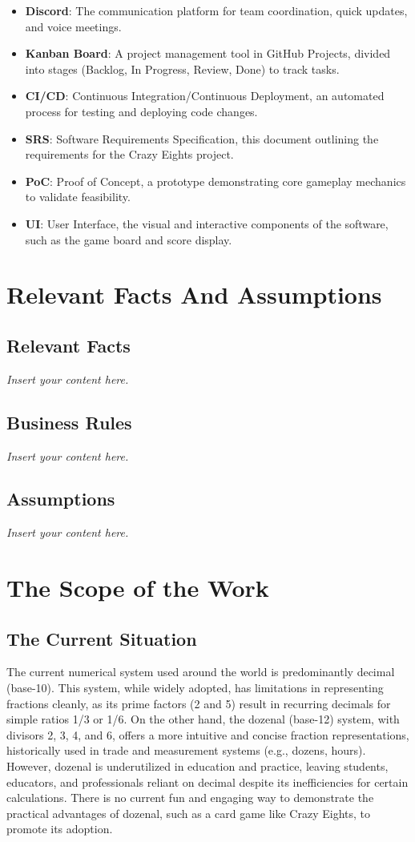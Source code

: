 \documentclass[12pt]{article}
\newcommand{\lips}{\textit{Insert your content here.}}
\begin{document}
\begin{itemize}
    \item \textbf{Discord}: The communication platform for team coordination, quick updates, and voice meetings.
    \item \textbf{Kanban Board}: A project management tool in GitHub Projects, divided into stages (Backlog, In Progress, Review, Done) to track tasks.
    \item \textbf{CI/CD}: Continuous Integration/Continuous Deployment, an automated process for testing and deploying code changes.
    \item \textbf{SRS}: Software Requirements Specification, this document outlining the requirements for the Crazy Eights project.
    \item \textbf{PoC}: Proof of Concept, a prototype demonstrating core gameplay mechanics to validate feasibility.
    \item \textbf{UI}: User Interface, the visual and interactive components of the software, such as the game board and score display.
\end{itemize}

\section{Relevant Facts And Assumptions}
\subsection{Relevant Facts}
\lips
\subsection{Business Rules}
\lips
\subsection{Assumptions}
\lips

\section{The Scope of the Work}
\subsection{The Current Situation}

The current numerical system used around the world is predominantly decimal (base-10). This system, while widely adopted, has limitations in representing fractions cleanly, as its prime factors (2 and 5) result in recurring decimals for simple ratios 1/3 or 1/6. On the other hand, the dozenal (base-12) system, with divisors 2, 3, 4, and 6, offers a more intuitive and concise fraction representations, historically used in trade and measurement systems (e.g., dozens, hours). However, dozenal is underutilized in education and practice, leaving students, educators, and professionals reliant on decimal despite its inefficiencies for certain calculations. There is no current fun and engaging way to demonstrate the practical advantages of dozenal, such as a card game like Crazy Eights, to promote its adoption.
\end{document}
